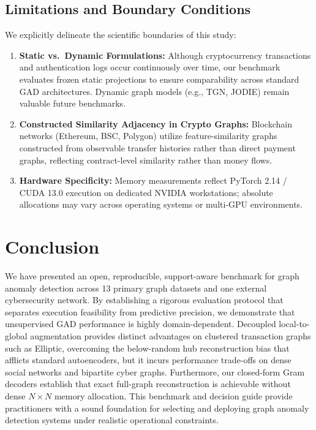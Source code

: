 \documentclass[applsci,article,submit,moreauthors,pdftex]{Definitions/mdpi}
\begin{document}
\subsection{Limitations and Boundary Conditions}
We explicitly delineate the scientific boundaries of this study:
\begin{enumerate}
    \item \textbf{Static vs.\ Dynamic Formulations:} Although cryptocurrency transactions and authentication logs occur continuously over time, our benchmark evaluates frozen static projections to ensure comparability across standard GAD architectures. Dynamic graph models (e.g., TGN, JODIE) remain valuable future benchmarks.
    \item \textbf{Constructed Similarity Adjacency in Crypto Graphs:} Blockchain networks (Ethereum, BSC, Polygon) utilize feature-similarity graphs constructed from observable transfer histories rather than direct payment graphs, reflecting contract-level similarity rather than money flows.
    \item \textbf{Hardware Specificity:} Memory measurements reflect PyTorch 2.14 / CUDA 13.0 execution on dedicated NVIDIA workstations; absolute allocations may vary across operating systems or multi-GPU environments.
\end{enumerate}

\section{Conclusion}
\label{sec:conclusion}
We have presented an open, reproducible, support-aware benchmark for graph anomaly detection across 13 primary graph datasets and one external cybersecurity network. By establishing a rigorous evaluation protocol that separates execution feasibility from predictive precision, we demonstrate that unsupervised GAD performance is highly domain-dependent. Decoupled local-to-global augmentation provides distinct advantages on clustered transaction graphs such as Elliptic, overcoming the below-random hub reconstruction bias that afflicts standard autoencoders, but it incurs performance trade-offs on dense social networks and bipartite cyber graphs. Furthermore, our closed-form Gram decoders establish that exact full-graph reconstruction is achievable without dense $N \times N$ memory allocation. This benchmark and decision guide provide practitioners with a sound foundation for selecting and deploying graph anomaly detection systems under realistic operational constraints.
\end{document}
